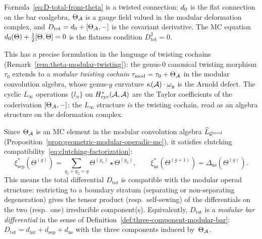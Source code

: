 \begin{remark}
\label{rem:D-tot-as-connection}%
\label{rem:theta-as-curved-twisting}%
Formula~\eqref{eq:D-total-from-theta} is a twisted connection:
$d_0$ is the flat connection on the bar coalgebra,
$\Theta_{\mathcal{A}}$ is a gauge field valued in the modular deformation
complex, and $D_{\mathrm{tot}} = d_0 + [\Theta_{\mathcal{A}}, -]$ is
the covariant derivative.
The MC equation
$d_0(\Theta) + \tfrac{1}{2}[\Theta, \Theta] = 0$
is the flatness condition $D_{\mathrm{tot}}^2 = 0$.

This has a precise formulation in the language of twisting cochains
(Remark~\ref{rem:theta-modular-twisting}):
the genus-$0$ canonical twisting morphism $\tau_0$ extends to a
\emph{modular twisting cochain}
$\tau_{\mathrm{mod}} = \tau_0 + \Theta_{\mathcal{A}}$
in the modular convolution algebra, whose genus-$g$ curvature
$\kappa(\mathcal{A})\cdot\omega_g$ is the Arnold defect.
The cyclic $L_\infty$ operations $\{l_n\}$ on
$H^*_{\mathrm{cyc}}(\mathcal{A},\mathcal{A})$ are the Taylor coefficients of the
coderivation $[\Theta_{\mathcal{A}}, -]$: the $L_\infty$ structure \emph{is}
the twisting cochain, read as an algebra structure on the
deformation complex.
\end{remark}

\begin{remark}
\label{rem:clutching-D-tot}
Since $\Theta_{\mathcal{A}}$ is an MC element in the modular convolution
algebra $\widehat{L}_{\mathcal{G}^{\mathrm{mod}}}$
(Proposition~\ref{prop:geometric-modular-operadic-mc}),
it satisfies clutching
compatibility~\eqref{eq:clutching-factorization}:
\[
\xi_{\mathrm{sep}}^*(\Theta^{(g)})
= \sum_{g_1+g_2=g} \Theta^{(g_1)} \star \Theta^{(g_2)},
\qquad
\xi_{\mathrm{ns}}^*(\Theta^{(g+1)})
= \Delta_{\mathrm{ns}}(\Theta^{(g)}).
\]
This means the total differential $D_{\mathrm{tot}}$ is
compatible with the modular operad structure: restricting to a
boundary stratum (separating or non-separating degeneration) gives
the tensor product (resp.\ self-sewing) of the differentials on the
two (resp.\ one) irreducible component(s).  Equivalently,
$D_{\mathrm{tot}}$ is a \emph{modular bar differential} in the
sense of Definition~\ref{def:three-component-modular-bar}:
$D_{\mathrm{tot}} = d_{\mathrm{int}} + d_{\mathrm{sep}} +
d_{\mathrm{ns}}$ with the three components induced by~$\Theta_{\mathcal{A}}$.
\end{remark}

